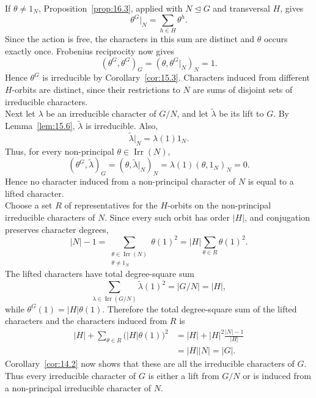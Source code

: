 \documentclass[../Odyssey_Project.tex]{subfiles}
\begin{document}
\begin{solution}
\[    \]
    If $\theta\neq1_N$, Proposition~\ref{prop:16.3}, applied with $N\trianglelefteq G$ and transversal $H$, gives
    \[
        \theta^G|_N=\sum_{h\in H}\theta^h.
    \]
    Since the action is free, the characters in this sum are distinct and $\theta$ occurs exactly once. Frobenius reciprocity now gives
    \[
        (\theta^G,\theta^G)_G
        =
        (\theta,\theta^G|_N)_N
        =
        1.
    \]
    Hence $\theta^G$ is irreducible by Corollary~\ref{cor:15.3}. Characters induced from different $H$-orbits are distinct, since their restrictions to $N$ are sums of disjoint sets of irreducible characters.\\
    Next let $\lambda$ be an irreducible character of $G/N$, and let $\widetilde{\lambda}$ be its lift to $G$. By Lemma~\ref{lem:15.6}, $\widetilde{\lambda}$ is irreducible. Also,
    \[
        \widetilde{\lambda}|_N=\lambda(1)1_N.
    \]
    Thus, for every non-principal $\theta\in\operatorname{Irr}(N)$,
    \[
        (\theta^G,\widetilde{\lambda})_G
        =
        (\theta,\widetilde{\lambda}|_N)_N
        =
        \lambda(1)(\theta,1_N)_N
        =
        0.
    \]
    Hence no character induced from a non-principal character of $N$ is equal to a lifted character.\\
    Choose a set $R$ of representatives for the $H$-orbits on the non-principal irreducible characters of $N$. Since every such orbit has order $|H|$, and conjugation preserves character degrees,
    \[
        |N|-1
        =
        \sum_{\substack{\theta\in\operatorname{Irr}(N)\\\theta\neq1_N}}\theta(1)^2
        =
        |H|\sum_{\theta\in R}\theta(1)^2.
    \]
    The lifted characters have total degree-square sum
    \[
        \sum_{\lambda\in\operatorname{Irr}(G/N)}\widetilde{\lambda}(1)^2
        =
        |G/N|
        =
        |H|,
    \]
    while $\theta^G(1)=|H|\theta(1)$. Therefore the total degree-square sum of the lifted characters and the characters induced from $R$ is
    \begin{align*}
        |H|+\sum_{\theta\in R}\bigl(|H|\theta(1)\bigr)^2
        &=
        |H|+|H|^2\frac{|N|-1}{|H|} \\
        &=
        |H||N|
        =
        |G|.
    \end{align*}
    Corollary~\ref{cor:14.2} now shows that these are all the irreducible characters of $G$. Thus every irreducible character of $G$ is either a lift from $G/N$ or is induced from a non-principal irreducible character of $N$.\\

\end{solution}
\end{document}
